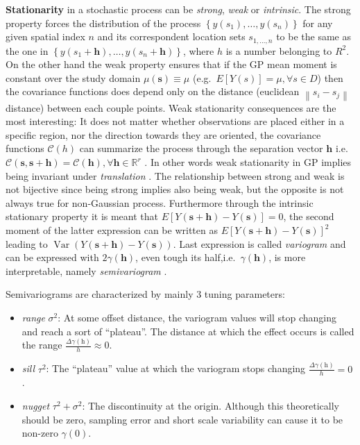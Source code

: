 \documentclass[
  12pt,
  a4paper,
  oneside]{book}
\providecommand{\tightlist}{%
  \setlength{\itemsep}{0pt}\setlength{\parskip}{0pt}}
\begin{document}
\textbf{Stationarity} in a stochastic process can be \emph{strong}, \emph{weak} or \emph{intrinsic}. The strong property forces the distribution of the process \(\left\{y\left(s_{1}\right), \ldots, y\left(s_{n}\right)\right\}\) for any given spatial index \(n\) and its correspondent location sets \(s_{1,\ldots,n}\) to be the same as the one in \(\left\{y\left(s_{1}+\boldsymbol{h}\right), \ldots, y\left(s_{n}+\boldsymbol{h}\right)\right\}\), where \(h\) is a number belonging to \(R^{2}\).
On the other hand the weak property ensures that if the GP mean moment is constant over the study domain \(\mu(\mathbf{s}) \equiv \mu\) (e.g.~\(E[Y(s)]=\mu, \forall s \in D\)) then the covariance functions does depend only on the distance (euclidean \(\left\|s_{i}-s_{j}\right\|\) distance) between each couple points.
Weak stationarity consequences are the most interesting: It does not matter whether observations are placed either in a specific region, nor the direction towards they are oriented, the covariance functions \(\mathcal{C}(h)\) can summarize the process through the separation vector \(\mathbf{h}\) i.e.~\(\mathcal{C}(\mathbf{s}, \mathbf{s}+\mathbf{h})=\mathcal{C}(\mathbf{h}), \forall \mathbf{h} \in \mathbb{R}^{r}\) \citep{Banerjee-Gelfand}. In other words weak stationarity in GP implies being invariant under \emph{translation} \citeyearpar{Krainski-Rubio}. The relationship between strong and weak is not bijective since being strong implies also being weak, but the opposite is not always true for non-Gaussian process.
Furthermore through the intrinsic stationary property it is meant that \(E[Y(\mathbf{s}+\mathbf{h})-Y(\mathbf{s})]=0\), the second moment of the latter expression can be written as \(E[Y(\mathbf{s}+\mathbf{h})-Y(\mathbf{s})]^{2}\) leading to \(\operatorname{Var}(Y(\mathbf{s}+\mathbf{h})-Y(\mathbf{s}))\). Last expression is called \emph{variogram} and can be expressed with \(2 \gamma(\mathbf{h})\), even tough its half,i.e.~\(\gamma(\mathbf{h})\), is more interpretable, namely \emph{semivariogram} \citep{Cressie_2015}.

Semivariograms are characterized by mainly 3 tuning parameters:

\begin{itemize}
\tightlist
\item
  \emph{range} \(\sigma^{2}\): At some offset distance, the variogram values will stop changing and reach a sort of ``plateau''. The distance at which the effect occurs is called the range \(\frac{\Delta\gamma(\mathrm{h})}{h} \approx 0\).
\item
  \emph{sill} \(\tau^{2}\): The ``plateau'' value at which the variogram stops changing \(\frac{\Delta\gamma(\mathrm{h})}{h} = 0\).
\item
  \emph{nugget} \(\tau^{2}+\sigma^{2}\): The discontinuity at the origin. Although this theoretically should be zero, sampling error and short scale variability can cause it to be non-zero \(\gamma(\mathrm{0})\).
\end{itemize}
\end{document}
